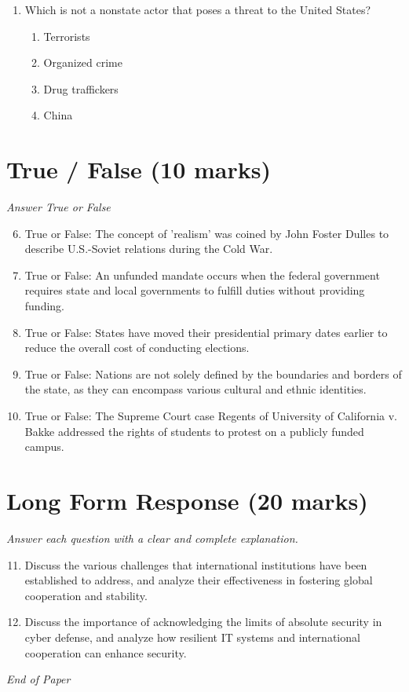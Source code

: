 \documentclass[12pt]{article}
\begin{document}
\begin{enumerate}[label=\arabic*.]
\begin{enumerate}[label=(\alph*)]
    \item Face-to-face meetings between state leaders
    \item The president consulting Congress on foreign policy issues
    \item Bilateral talks that do not involve a third-party negotiator
\end{enumerate}
\item Which is not a nonstate actor that poses a threat to the United States?
\begin{enumerate}[label=(\alph*)]
    \item Terrorists
    \item Organized crime
    \item Drug traffickers
    \item China
\end{enumerate}
\end{enumerate}

\section*{True / False (10 marks)}
\textit{Answer True or False}
\begin{enumerate}[label=\arabic*.]
\setcounter{enumi}{5}
\item True or False: The concept of 'realism' was coined by John Foster Dulles to describe U.S.-Soviet relations during the Cold War.
\item True or False: An unfunded mandate occurs when the federal government requires state and local governments to fulfill duties without providing funding.
\item True or False: States have moved their presidential primary dates earlier to reduce the overall cost of conducting elections.
\item True or False: Nations are not solely defined by the boundaries and borders of the state, as they can encompass various cultural and ethnic identities.
\item True or False: The Supreme Court case Regents of University of California v. Bakke addressed the rights of students to protest on a publicly funded campus.
\end{enumerate}

\section*{Long Form Response (20 marks)}
\textit{Answer each question with a clear and complete explanation.}
\begin{enumerate}[label=\arabic*.]
\setcounter{enumi}{10}
\item Discuss the various challenges that international institutions have been established to address, and analyze their effectiveness in fostering global cooperation and stability.
\item Discuss the importance of acknowledging the limits of absolute security in cyber defense, and analyze how resilient IT systems and international cooperation can enhance security.
\end{enumerate}

\vfill
\noindent\textit{End of Paper}
\end{document}
